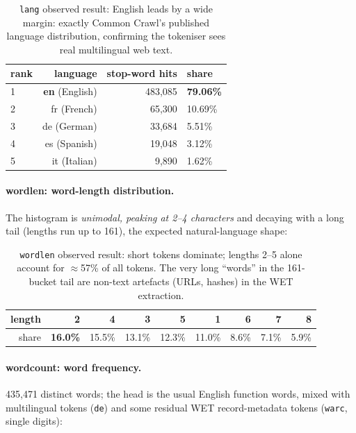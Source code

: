 \documentclass[11pt,a4paper]{article}
\newcommand{\code}[1]{\texttt{\small #1}}
\begin{document}
\begin{table}[H]
\centering
\small
\renewcommand{\arraystretch}{1.15}
\begin{tabular}{@{}lrrl@{}}
\toprule
rank & language & stop-word hits & share\\
\midrule
1 & \textbf{en} (English) & 483{,}085 & \textbf{79.06\%}\\
2 & fr (French)  & 65{,}300 & 10.69\%\\
3 & de (German)  & 33{,}684 & \phantom{0}5.51\%\\
4 & es (Spanish) & 19{,}048 & \phantom{0}3.12\%\\
5 & it (Italian) & \phantom{0}9{,}890 & \phantom{0}1.62\%\\
\bottomrule
\end{tabular}
\caption{\code{lang} observed result: English leads by a wide margin: exactly
Common Crawl's published language distribution, confirming the tokeniser sees
real multilingual web text.}
\end{table}

\paragraph{wordlen: word-length distribution.} The histogram is \emph{unimodal,
peaking at 2–4 characters} and decaying with a long tail (lengths run up to
161), the expected natural-language shape:

\begin{table}[H]
\centering
\small
\renewcommand{\arraystretch}{1.1}
\begin{tabular}{@{}rrrrrrrrr@{}}
\toprule
length & 2 & 4 & 3 & 5 & 1 & 6 & 7 & 8\\
\midrule
share & \textbf{16.0\%} & 15.5\% & 13.1\% & 12.3\% & 11.0\% & 8.6\% & 7.1\% & 5.9\%\\
\bottomrule
\end{tabular}
\caption{\code{wordlen} observed result: short tokens dominate; lengths 2–5
alone account for $\approx$57\% of all tokens. The very long ``words'' in the
161-bucket tail are non-text artefacts (URLs, hashes) in the WET extraction.}
\end{table}

\paragraph{wordcount: word frequency.} 435{,}471 distinct words; the head is the
usual English function words, mixed with multilingual tokens (\code{de}) and
some residual WET record-metadata tokens (\code{warc}, single digits):
\end{document}

